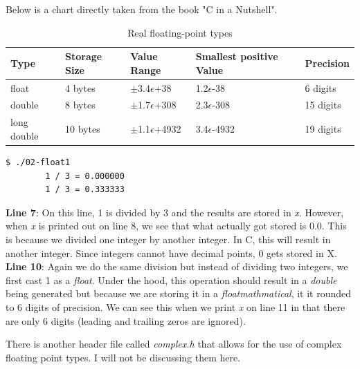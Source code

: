 \documentclass[../main.tex]{subfiles}
\begin{document}
	Below is a chart directly taken from the book "C in a Nutshell"\cite{c_nutshell}.
	\begin{table}[h]
		\centering
		\begin{tabular}{l l l l l}
			\toprule
			\textbf{Type} & \textbf{Storage Size} & \textbf{Value Range} & \textbf{Smallest positive Value} & \textbf{Precision}\\
			\midrule
			float\index{float} & 4 bytes & $\pm$3.4$\epsilon$+38 & 1.2$\epsilon$-38 & 6 digits \\
			double\index{double} & 8 bytes & $\pm$1.7$\epsilon$+308 & 2.3$\epsilon$-308 & 15 digits \\
			long double\index{long double} & 10 bytes & $\pm$1.1$\epsilon$+4932 & 3.4$\epsilon$-4932 & 19 digits \\
			\bottomrule
		\end{tabular}
		\caption{Real floating-point types}
		\label{tab:floating-point} %
	\end{table}

	
	
	\begin{lstlisting}[language=bash, numbers=none]
		$ ./02-float1 
		1 / 3 = 0.000000
		1 / 3 = 0.333333
	\end{lstlisting}
	
	\textbf{Line 7}: On this line, 1 is divided by 3 and the results are stored in \textit{x}.  However, when \textit{x} is printed out on line 8, we see that what actually got stored is 0.0.  This is because we divided one integer by another integer.  In C, this will result in another integer.  Since integers cannot have decimal points, 0 gets stored in X.\\
	\textbf{Line 10}: Again we do the same division but instead of dividing two integers, we first cast 1 as a \textit{float}.  Under the hood, this operation should result in a \textit{double} being generated but because we are storing it in a \textit{floatmathmatical}, it it rounded to 6 digits of precision.  We can see this when we print \textit{x} on line 11 in that there are only 6 digits (leading and trailing zeros are ignored).
	
	There is another header file called \textit{complex.h} that allows for the use of complex floating point types.  I will not be discussing them here.
	
	\clearpage
\end{document}
